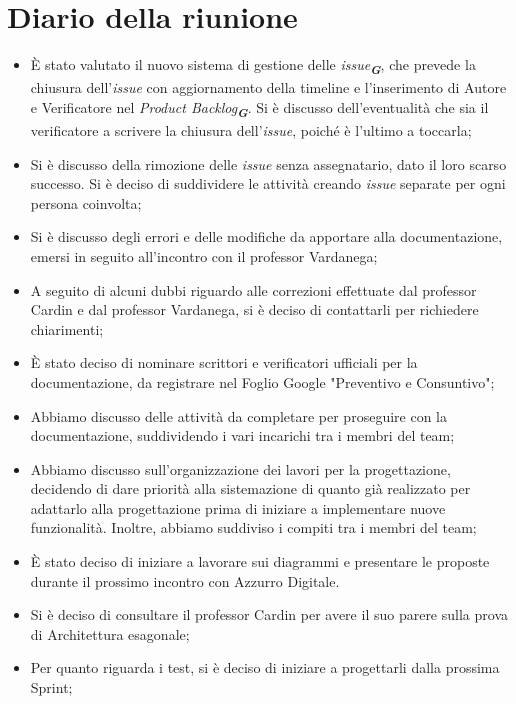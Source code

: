 
\section{Diario della riunione}

\begin{itemize}
    \item È stato valutato il nuovo sistema di gestione delle \emph{issue}\textsubscript{\textit{\textbf{G}}}, che prevede la chiusura dell'\emph{issue} con aggiornamento della timeline e l'inserimento di Autore e Verificatore nel \emph{Product Backlog}\textsubscript{\textit{\textbf{G}}}. Si è discusso dell'eventualità che sia il verificatore a scrivere la chiusura dell'\emph{issue}, poiché è l'ultimo a toccarla;
    \item Si è discusso della rimozione delle \emph{issue} senza assegnatario, dato il loro scarso successo. Si è deciso di suddividere le attività creando \emph{issue} separate per ogni persona coinvolta;
    \item Si è discusso degli errori e delle modifiche da apportare alla documentazione, emersi in seguito all'incontro con il professor Vardanega;
    \item A seguito di alcuni dubbi riguardo alle correzioni effettuate dal professor Cardin e dal professor Vardanega, si è deciso di contattarli per richiedere chiarimenti;
    \item È stato deciso di nominare scrittori e verificatori ufficiali per la documentazione, da registrare nel Foglio Google "Preventivo e Consuntivo";
    \item Abbiamo discusso delle attività da completare per proseguire con la documentazione, suddividendo i vari incarichi tra i membri del team;
    \item Abbiamo discusso sull'organizzazione dei lavori per la progettazione, decidendo di dare priorità alla sistemazione di quanto già realizzato per adattarlo alla progettazione prima di iniziare a implementare nuove funzionalità. Inoltre, abbiamo suddiviso i compiti tra i membri del team;
    \item È stato deciso di iniziare a lavorare sui diagrammi e presentare le proposte durante il prossimo incontro con Azzurro Digitale. 
    \item Si è deciso di consultare il professor Cardin per avere il suo parere sulla prova di Architettura esagonale;
    \item Per quanto riguarda i test, si è deciso di iniziare a progettarli dalla prossima Sprint;
 \end{itemize}

